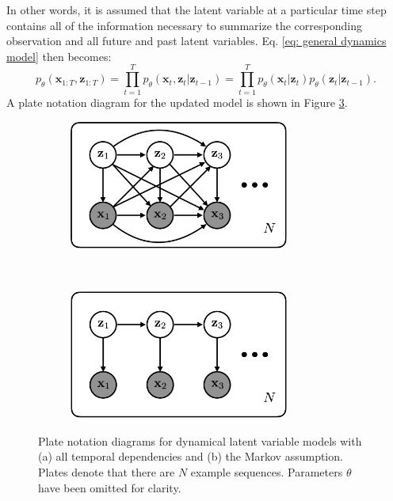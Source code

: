 In other words, it is assumed that the latent variable at a particular time step contains all of the information necessary to summarize the corresponding observation and all future and past latent variables. Eq. \ref{eq: general dynamics model} then becomes:
\begin{equation}
    p_\theta (\mathbf{x}_{1:T}, \mathbf{z}_{1:T}) = \prod_{t=1}^T p_\theta (\mathbf{x}_t, \mathbf{z}_t | \mathbf{z}_{t-1}) = \prod_{t=1}^T p_\theta (\mathbf{x}_t | \mathbf{z}_{t}) p_\theta (\mathbf{z}_t | \mathbf{z}_{t-1}).
    \label{eq: markov dynamics model}
\end{equation}
A plate notation diagram for the updated model is shown in Figure \ref{fig: markov_dynamical_model}.

\begin{figure}[t!]
    \centering
    \begin{subfigure}[t]{0.5\textwidth}
        \centering
        \includegraphics[width=0.8\textwidth]{images/graphical_models/full_dynamical_model.png}
        \caption{ }
        \label{fig: full_dynamical_model}
    \end{subfigure}%
    ~ 
    \begin{subfigure}[t]{0.5\textwidth}
        \centering
        \includegraphics[width=0.8\textwidth]{images/graphical_models/markov_dynamical_model.png}
        \caption{ }
        \label{fig: markov_dynamical_model}
    \end{subfigure}
    \caption{Plate notation diagrams for dynamical latent variable models with (a) all temporal dependencies and (b) the Markov assumption. Plates denote that there are $N$ example sequences. Parameters $\theta$ have been omitted for clarity.}
\end{figure}

